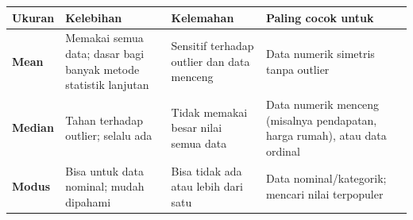 \documentclass[
  indonesian,
  letterpaper,
]{book}
\newcounter{none} %
\begin{document}
{\def\LTcaptype{none} %
\begin{longtable}[]{@{}
  >{\raggedright\arraybackslash}p{}
  >{\raggedright\arraybackslash}p{}
  >{\raggedright\arraybackslash}p{}
  >{\raggedright\arraybackslash}p{}@{}}
\toprule\noalign{}
\begin{minipage}[b]{\linewidth}\raggedright
Ukuran
\end{minipage} & \begin{minipage}[b]{\linewidth}\raggedright
Kelebihan
\end{minipage} & \begin{minipage}[b]{\linewidth}\raggedright
Kelemahan
\end{minipage} & \begin{minipage}[b]{\linewidth}\raggedright
Paling cocok untuk
\end{minipage} \\
\midrule\noalign{}
\endhead
\bottomrule\noalign{}
\endlastfoot
\textbf{Mean} & Memakai semua data; dasar bagi banyak metode statistik
lanjutan & Sensitif terhadap outlier dan data menceng & Data numerik
simetris tanpa outlier \\
\textbf{Median} & Tahan terhadap outlier; selalu ada & Tidak memakai
besar nilai semua data & Data numerik menceng (misalnya pendapatan,
harga rumah), atau data ordinal \\
\textbf{Modus} & Bisa untuk data nominal; mudah dipahami & Bisa tidak
ada atau lebih dari satu & Data nominal/kategorik; mencari nilai
terpopuler \\
\end{longtable}
}
\end{document}
